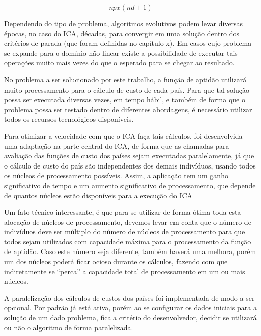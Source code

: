 \[np x (nd + 1)\]


Dependendo do tipo de problema, algoritmos evolutivos podem levar diversas épocas, no caso do ICA, décadas, para convergir em uma solução dentro dos critérios de parada (que foram definidas no capítulo x). Em casos cujo problema se expande para o domínio não linear existe a possibilidade de executar tais operações muito mais vezes do que o esperado para se chegar ao resultado. 


No problema a ser solucionado por este trabalho, a função de aptidão utilizará muito processamento para o cálculo de custo de cada país. Para que tal solução possa ser executada diversas vezes, em tempo hábil, e também de forma que o problema possa ser testado dentro de diferentes abordagens, é necessário utilizar todos os recursos tecnológicos disponíveis. 


Para otimizar a velocidade com que o ICA faça tais cálculos, foi desenvolvida uma adaptação na parte central do ICA, de forma que as chamadas para avaliação das funções de custo dos países sejam executadas paralelamente, já que o cálculo de custo do país são independentes dos demais indivíduos, usando todos os núcleos de processamento possíveis. Assim, a aplicação tem um ganho significativo de tempo e um aumento significativo de processamento, que depende de quantos núcleos estão disponíveis para a execução do ICA


Um fato técnico interessante, é que para se utilizar de forma ótima toda esta alocação de núcleos de processamento, devemos levar em conta que o número de indivíduos deve ser múltiplo do número de núcleos de processamento para que todos sejam utilizados com capacidade máxima para o processamento da função de aptidão. Caso este número seja diferente, também haverá uma melhora, porém um dos núcleos poderá ficar ocioso durante os cálculos, fazendo com que indiretamente se “perca” a capacidade total de processamento em um ou mais núcleos. 


A paralelização dos cálculos de custos dos países foi implementada de modo a ser opcional. Por padrão já está ativa, porém ao se configurar os dados iniciais para a solução de um dado problema, fica a critério do desenvolvedor, decidir se utilizará ou não o algoritmo de forma paralelizada.


